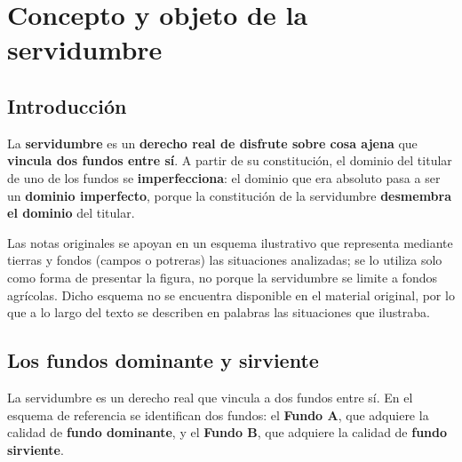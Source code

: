 \documentclass[12pt,oneside]{book}
\begin{document}
\tableofcontents


\chapter{Concepto y objeto de la servidumbre}

\section{Introducción}

La \textbf{servidumbre} es un \textbf{derecho real de disfrute sobre cosa ajena} que \textbf{vincula dos fundos entre sí}. A partir de su constitución, el dominio del titular de uno de los fundos se \textbf{imperfecciona}: el dominio que era absoluto pasa a ser un \textbf{dominio imperfecto}, porque la constitución de la servidumbre \textbf{desmembra el dominio} del titular.

\begin{note}
Las notas originales se apoyan en un esquema ilustrativo que representa mediante tierras y fondos (campos o potreras) las situaciones analizadas; se lo utiliza solo como forma de presentar la figura, no porque la servidumbre se limite a fondos agrícolas. Dicho esquema no se encuentra disponible en el material original, por lo que a lo largo del texto se describen en palabras las situaciones que ilustraba.
\end{note}

\section{Los fundos dominante y sirviente}

La servidumbre es un derecho real que vincula a dos fundos entre sí. En el esquema de referencia se identifican dos fundos: el \textbf{Fundo A}, que adquiere la calidad de \textbf{fundo dominante}, y el \textbf{Fundo B}, que adquiere la calidad de \textbf{fundo sirviente}.
\end{document}
